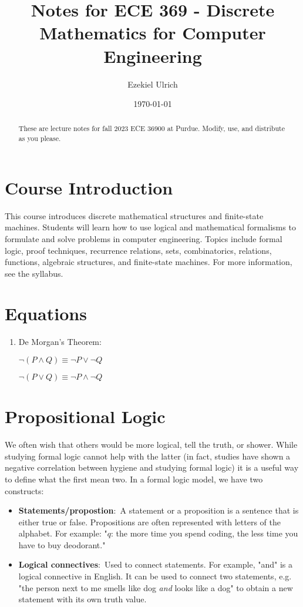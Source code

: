 \documentclass[nobib]{tufte-handout}
\title{Notes for ECE 369 - Discrete Mathematics for Computer Engineering}
\author[Ezekiel Ulrich]{Ezekiel Ulrich}
\date{\today}  %
\newcommand{\defn}[2]{\noindent\textbf{#1}:\ #2}
\begin{document}
\maketitle

\begin{abstract}
These are lecture notes for fall 2023 ECE 36900 at Purdue. Modify, use, and distribute as you please.
\end{abstract}

\tableofcontents

\section{Course Introduction}

This course introduces discrete mathematical structures and 
finite-state machines. Students will learn how to use logical 
and mathematical formalisms to formulate and solve problems in 
computer engineering. Topics include formal logic, proof techniques, 
recurrence relations, sets, combinatorics, relations, functions, 
algebraic structures, and finite-state machines. For more information,
see the syllabus. 

\section{Equations}

\begin{enumerate}
    \item De Morgan's Theorem: 
    
    $\neg(P \wedge Q) \equiv \neg P \vee \neg Q$

    $\neg(P \vee Q) \equiv \neg P \wedge \neg Q$
\end{enumerate}

\section{Propositional Logic}

We often wish that others would be more logical, tell the truth,
or shower. While studying formal logic cannot help with the latter
(in fact, studies have shown a negative correlation between
hygiene and studying formal logic) it is a useful way to 
define what the first mean two. In a formal logic model, we have two constructs:
\begin{itemize}
    \item \defn{Statements/propostion}{A statement or a proposition is a sentence that
    is either true or false.} Propositions are often represented 
    with letters of the alphabet. For example: "$q$: the more time
    you spend coding, the less time you have to buy deodorant."
    \item \defn{Logical connectives}{Used to connect statements.} For 
    example, "and" is a logical connective in English. It can be
    used to connect two statements, e.g. "the person next to me
    smells like dog \emph{and} looks like a dog" to obtain 
    a new statement with its own truth value. 
\end{itemize}
\end{document}

